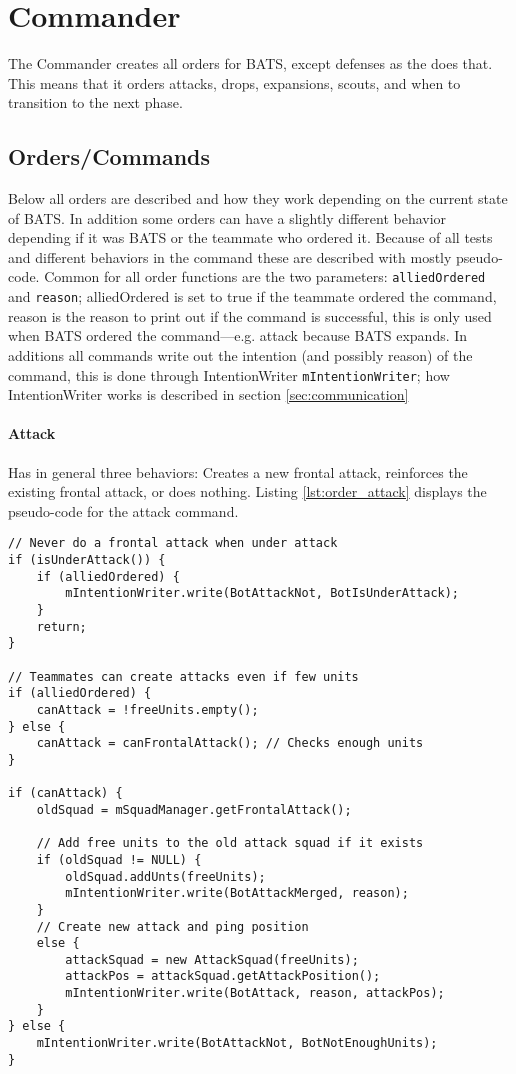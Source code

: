 \section{Commander}
\label{sec:commander}
The Commander creates all orders for BATS, except defenses as the  does that. This means that it orders attacks, drops, expansions, scouts, and when to transition to the next phase.

\subsection{Orders/Commands}
Below all orders are described and how they work depending on the current state of BATS. In addition some orders can have a slightly different behavior depending if it was BATS or the teammate who ordered it. Because of all tests and different behaviors in the command these are described with mostly pseudo-code. Common for all order functions are the two parameters: \texttt{alliedOrdered} and \texttt{reason}; alliedOrdered is set to true if the teammate ordered the command, reason is the reason to print out if the command is successful, this is only used when BATS ordered the command—e.g. attack because BATS expands. In additions all commands write out the intention (and possibly reason) of the command, this is done through IntentionWriter \texttt{mIntentionWriter}; how IntentionWriter works is described in section \ref{sec:communication}

\paragraph{Attack}
Has in general three behaviors: Creates a new frontal attack, reinforces the existing frontal attack, or does nothing. Listing \ref{lst:order_attack} displays the pseudo-code for the attack command.
\begin{lstlisting}[label={lst:order_attack},caption={Pseudo-code for the attack command}]
// Never do a frontal attack when under attack
if (isUnderAttack()) {
	if (alliedOrdered) {
		mIntentionWriter.write(BotAttackNot, BotIsUnderAttack);
	}
	return;
}

// Teammates can create attacks even if few units
if (alliedOrdered) {
	canAttack = !freeUnits.empty();
} else {
	canAttack = canFrontalAttack(); // Checks enough units
}

if (canAttack) {
	oldSquad = mSquadManager.getFrontalAttack();
	
	// Add free units to the old attack squad if it exists
	if (oldSquad != NULL) {
		oldSquad.addUnts(freeUnits);
		mIntentionWriter.write(BotAttackMerged, reason);
	}
	// Create new attack and ping position
	else {
		attackSquad = new AttackSquad(freeUnits);
		attackPos = attackSquad.getAttackPosition();
		mIntentionWriter.write(BotAttack, reason, attackPos);
	}
} else {
	mIntentionWriter.write(BotAttackNot, BotNotEnoughUnits);
}
\end{lstlisting}

